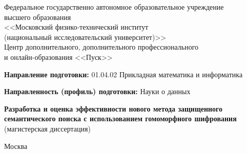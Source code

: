 \documentclass[a4paper, 12pt, oneside, openany]{article}
\begin{document}
\begin{titlepage} %
\begin{center} %
Федеральное государственно автономное образовательное учреждение\\ высшего образования\\
<<Московский физико-технический институт \\ (национальный исследовательский университет)>>\\
Центр дополнительного, дополнительного профессионального\\и онлайн-образования <<Пуск>>\\ [2cm]
\end{center} %
\par
\textbf{Направление подготовки:} 01.04.02 Прикладная математика и информатика

\textbf{Направленность (профиль) подготовки:} Науки о данных

\vspace{2cm}

\begin{center} %
{\huge\textbf{Разработка и оценка эффективности нового метода защищенного семантического поиска с использованием гомоморфного шифрования}}\\
(магистерская диссертация)\\[2cm]
\end{center} %
\vfill %
\begin{center}{Москва \the\year}\end{center} %
\thispagestyle{empty} %
\end{titlepage} %
\end{document}
